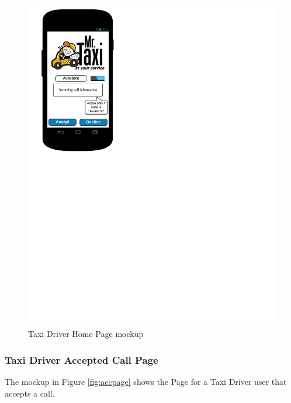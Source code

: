 \begin{figure}[htbp]
\centering
\includegraphics[width=\textwidth]{cpt/img/DriverHome}
\caption{Taxi Driver Home Page mockup}
\label{fig:drivhome}
\end{figure}

\subsubsection{Taxi Driver Accepted Call Page}
The mockup in Figure \ref{fig:accpage} shows the Page for a Taxi Driver user that accepts a call.

